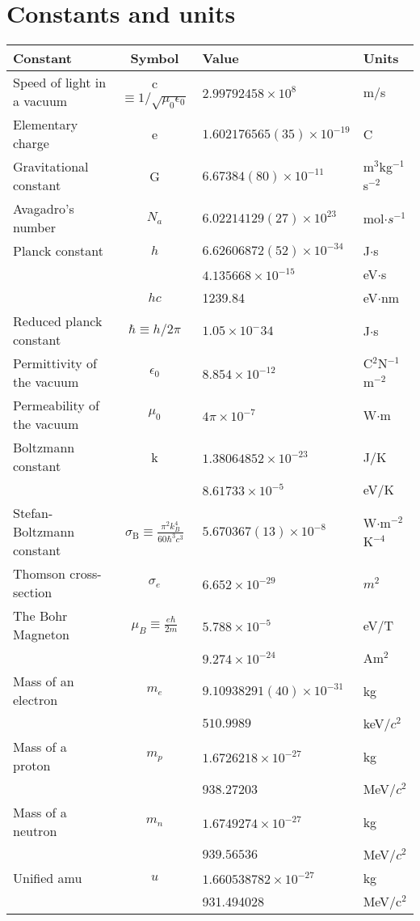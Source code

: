 \chapter{Constants and units}
\thispagestyle{fancy}
\begin{fancybox}{}	
\begin{center}
	\begin{tabular}{   l  |  c  |  l  |  l  }
		Constant & Symbol & Value & Units \\
		\hline
		Speed of light in a vacuum& c $\equiv 1/\sqrt{\mu_0\epsilon_0}$ & $2.99792458 \times 10^8$ & m/s \\
		Elementary charge& e & $1.602176565(35)\times 10^{-19}$ & C\\
		Gravitational constant& G & $6.67384(80)\times 10^{-11}$ & m$^3$kg$^{-1}$s$^{-2}$\\
		Avagadro's number& $N_a$ & $6.02214129(27)\times 10^{23}$ & mol$\cdot s^{-1}$\\
		Planck constant & $h$ & $ 6.62606872(52) \times 10^{-34}$ & J$\cdot$s \\
		& & $4.135668 \times 10^{-15}$ & eV$\cdot$s \\
		& $hc$ & 1239.84 & eV$\cdot$nm \\
		Reduced planck constant& $\hbar \equiv h/2\pi$ & $1.05\times 10^-{34}$ & J$\cdot$s\\
		Permittivity of the vacuum & $\epsilon_0$ & $8.854\times 10^{-12}$ & C$^2$N$^{-1}$m$^{-2}$ \\
		Permeability of the vacuum & $\mu_0$ & $4\pi\times 10^{-7}$ & W$\cdot$m \\
		Boltzmann constant & k & $1.38064852\times 10^{-23}$ & J/K \\
				 & & $8.61733\times 10^{-5}$ & eV/K \\
		Stefan-Boltzmann constant & $\sigma_{\textrm{B}} \equiv \frac{\pi^2k_B^4}{60\hbar^3c^3}$ & $5.670367(13)\times 10^{-8}$ & W$\cdot$m$^{-2}$K$^{-4}$ \\
		Thomson cross-section & $\sigma_e$ & $6.652\times10^{-29}$ & $m^2$ \\
		The Bohr Magneton & $\mu_B \equiv \frac{e\hbar}{2m}$ & $5.788\times 10^{-5}$ & eV/T \\
		& & $9.274\times 10^{-24}$ & Am$^2$ \\
		Mass of an electron & $m_e$ & $9.10938291(40)\times 10^{-31}$ & kg\\
		&  & $510.9989$ & keV/$c^2$\\
		Mass of a proton& $m_p$ & $1.6726218 \times 10^{-27}$ & kg\\
		&  & 938.27203 & MeV/$c^2$\\
		Mass of a neutron& $m_n$   & $1.6749274 \times 10^{-27}$ & kg \\
		& & $939.56536$ & MeV/$c^2$	\\
		Unified amu & $u$ &  $1.660538782\times 10^{-27}$ & kg \\
		  &   &  931.494028 & MeV/c$^2$ 
	\end{tabular}
\end{center}
\end{fancybox}

